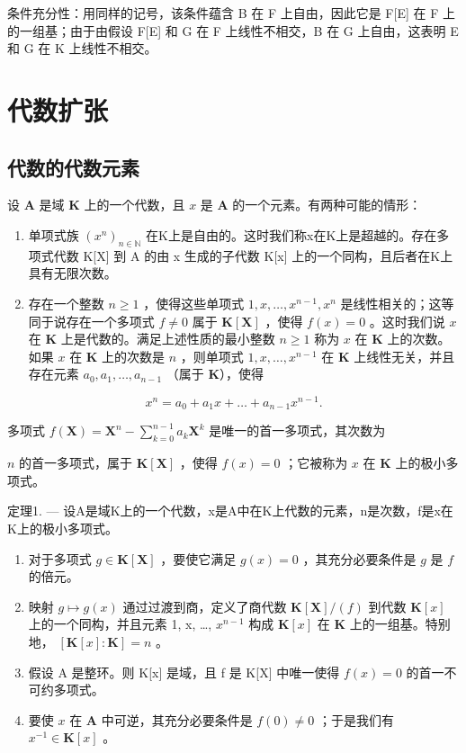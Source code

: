 条件充分性：用同样的记号，该条件蕴含 B 在 F 上自由，因此它是 F{[}E{]} 在 F 上的一组基；由于由假设 F{[}E{]} 和 G 在 F 上线性不相交，B 在 G 上自由，这表明 E 和 G 在 K 上线性不相交。

\section{代数扩张}

\subsection{代数的代数元素}

设 \(\mathbf{A}\) 是域 \(\mathbf{K}\) 上的一个代数，且 \(x\) 是 \(\mathbf{A}\) 的一个元素。有两种可能的情形：

\begin{enumerate}
\def\labelenumi{\alph{enumi})}
\item
  单项式族 \((x^{n})_{n\in\mathbb{N}}\) 在K上是自由的。这时我们称x在K上是超越的。存在多项式代数 K{[}X{]} 到 A 的由 x 生成的子代数 K{[}x{]} 上的一个同构，且后者在K上具有无限次数。
\item
  存在一个整数 \(n \geqslant 1\) ，使得这些单项式 \(1, x, \ldots, x^{n-1}, x^n\) 是线性相关的；这等同于说存在一个多项式 \(f \neq 0\) 属于 \(\mathbf{K}[\mathbf{X}]\) ，使得 \(f(x) = 0\) 。这时我们说 \(x\) 在 \(\mathbf{K}\) 上是代数的。满足上述性质的最小整数 \(n \geqslant 1\) 称为 \(x\) 在 \(\mathbf{K}\) 上的次数。如果 \(x\) 在 \(\mathbf{K}\) 上的次数是 \(n\) ，则单项式 \(1, x, \ldots, x^{n-1}\) 在 \(\mathbf{K}\) 上线性无关，并且存在元素 \(a_0, a_1, \ldots, a_{n-1}\) （属于 \(\mathbf{K}\)），使得
\end{enumerate}

\[
x ^ {n} = a _ {0} + a _ {1} x + \dots + a _ {n - 1} x ^ {n - 1}.
\]

多项式 \(f(\mathbf{X}) = \mathbf{X}^n - \sum_{k=0}^{n-1} a_k \mathbf{X}^k\) 是唯一的首一多项式，其次数为

\(n\) 的首一多项式，属于 \(\mathbf{K}[\mathbf{X}]\) ，使得 \(f(x) = 0\) ；它被称为 \(x\) 在 \(\mathbf{K}\) 上的极小多项式。

定理1. --- 设A是域K上的一个代数，x是A中在K上代数的元素，n是次数，f是x在K上的极小多项式。

\begin{enumerate}
\def\labelenumi{\alph{enumi})}
\item
  对于多项式 \(g \in \mathbf{K}[\mathbf{X}]\) ，要使它满足 \(g(x) = 0\) ，其充分必要条件是 \(g\) 是 \(f\) 的倍元。
\item
  映射 \(g \mapsto g(x)\) 通过过渡到商，定义了商代数 \(\mathbf{K}[\mathbf{X}] / (f)\) 到代数 \(\mathbf{K}[x]\) 上的一个同构，并且元素 1, x, \ldots, \(x^{n-1}\) 构成 \(\mathbf{K}[x]\) 在 \(\mathbf{K}\) 上的一组基。特别地， \([\mathbf{K}[x]: \mathbf{K}] = n\) 。
\item
  假设 A 是整环。则 K{[}x{]} 是域，且 f 是 K{[}X{]} 中唯一使得 \(f(x) = 0\) 的首一不可约多项式。
\item
  要使 \(x\) 在 \(\mathbf{A}\) 中可逆，其充分必要条件是 \(f(0) \neq 0\) ；于是我们有 \(x^{-1} \in \mathbf{K}[x]\) 。
\end{enumerate}

